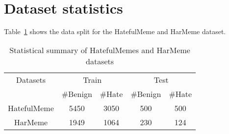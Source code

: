 \documentclass[11pt]{article}
\begin{document}
\section{Dataset statistics}
Table~\ref{tab:dataset_stats} shows the data split for the HatefulMeme and HarMeme dataset.
\label{appendix:data_stats}
\begin{table}[h]
\small
\centering
\caption{Statistical summary of HatefulMemes and HarMeme datasets}
\begin{tabular}{c|cc|cc}
\toprule
Datasets  & \multicolumn{2}{c}{Train}  & \multicolumn{2}{c}{Test}  \\
& \#Benign & \#Hate & \#Benign & \#Hate  \\
\midrule
HatefulMeme &   5450 & 3050 & 500 & 500              \\
\midrule
HarMeme  & 1949 & 1064 & 230 & 124             \\
\bottomrule
\end{tabular}\label{tab:dataset_stats}
\end{table}
\end{document}
